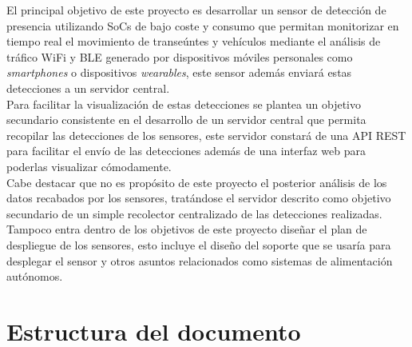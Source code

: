 \documentclass[../proyecto.tex]{subfiles}
\begin{document}
El principal objetivo de este proyecto es desarrollar un sensor de detección de presencia utilizando SoCs de bajo coste y consumo que permitan monitorizar en tiempo real el movimiento de transeúntes y vehículos mediante el análisis de tráfico WiFi y BLE generado por dispositivos móviles personales como \textit{smartphones} o dispositivos \textit{wearables}, este sensor además enviará estas detecciones a un servidor central.\\

Para facilitar la visualización de estas detecciones se plantea un objetivo secundario consistente en el desarrollo de un servidor central que permita recopilar las detecciones de los sensores, este servidor constará de una API REST para facilitar el envío de las detecciones además de una interfaz web para poderlas visualizar cómodamente.\\

Cabe destacar que no es propósito de este proyecto el posterior análisis de los datos recabados por los sensores, tratándose el servidor descrito como objetivo secundario de un simple recolector centralizado de las detecciones realizadas. Tampoco entra dentro de los objetivos de este proyecto diseñar el plan de despliegue de los sensores, esto incluye el diseño del soporte que se usaría para desplegar el sensor y otros asuntos relacionados como sistemas de alimentación autónomos.\\

\section{Estructura del documento}
\end{document}
